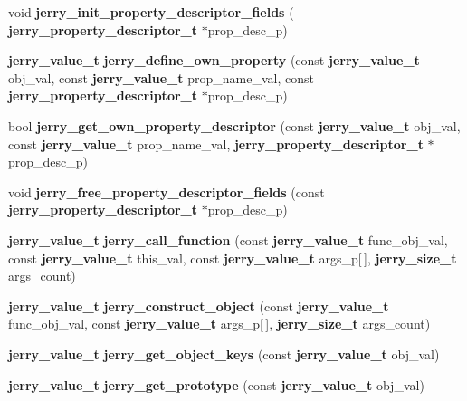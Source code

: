 \begin{DoxyCompactItemize}
void {\bfseries jerry\+\_\+init\+\_\+property\+\_\+descriptor\+\_\+fields} (\textbf{ jerry\+\_\+property\+\_\+descriptor\+\_\+t} $\ast$prop\+\_\+desc\+\_\+p)
\item 
\mbox{\label{group___core_gaf5ddf99f83fd7c4909d492ae2127e612}} 
\textbf{ jerry\+\_\+value\+\_\+t} {\bfseries jerry\+\_\+define\+\_\+own\+\_\+property} (const \textbf{ jerry\+\_\+value\+\_\+t} obj\+\_\+val, const \textbf{ jerry\+\_\+value\+\_\+t} prop\+\_\+name\+\_\+val, const \textbf{ jerry\+\_\+property\+\_\+descriptor\+\_\+t} $\ast$prop\+\_\+desc\+\_\+p)
\item 
\mbox{\label{group___core_gaced8232545e50e1c7a4db236c0495664}} 
bool {\bfseries jerry\+\_\+get\+\_\+own\+\_\+property\+\_\+descriptor} (const \textbf{ jerry\+\_\+value\+\_\+t} obj\+\_\+val, const \textbf{ jerry\+\_\+value\+\_\+t} prop\+\_\+name\+\_\+val, \textbf{ jerry\+\_\+property\+\_\+descriptor\+\_\+t} $\ast$prop\+\_\+desc\+\_\+p)
\item 
\mbox{\label{group___core_ga654d73b37a98d0ee2759dbc88948e65e}} 
void {\bfseries jerry\+\_\+free\+\_\+property\+\_\+descriptor\+\_\+fields} (const \textbf{ jerry\+\_\+property\+\_\+descriptor\+\_\+t} $\ast$prop\+\_\+desc\+\_\+p)
\item 
\mbox{\label{group___core_ga7e0345eb1c1fdd4fe729eb489dd697fc}} 
\textbf{ jerry\+\_\+value\+\_\+t} {\bfseries jerry\+\_\+call\+\_\+function} (const \textbf{ jerry\+\_\+value\+\_\+t} func\+\_\+obj\+\_\+val, const \textbf{ jerry\+\_\+value\+\_\+t} this\+\_\+val, const \textbf{ jerry\+\_\+value\+\_\+t} args\+\_\+p[$\,$], \textbf{ jerry\+\_\+size\+\_\+t} args\+\_\+count)
\item 
\mbox{\label{group___core_ga72116950ef694f16ca88e0b677bdcdac}} 
\textbf{ jerry\+\_\+value\+\_\+t} {\bfseries jerry\+\_\+construct\+\_\+object} (const \textbf{ jerry\+\_\+value\+\_\+t} func\+\_\+obj\+\_\+val, const \textbf{ jerry\+\_\+value\+\_\+t} args\+\_\+p[$\,$], \textbf{ jerry\+\_\+size\+\_\+t} args\+\_\+count)
\item 
\mbox{\label{group___core_gae9144b031e8a557b9bcddd65d402fcf6}} 
\textbf{ jerry\+\_\+value\+\_\+t} {\bfseries jerry\+\_\+get\+\_\+object\+\_\+keys} (const \textbf{ jerry\+\_\+value\+\_\+t} obj\+\_\+val)
\item 
\mbox{\label{group___core_gad5295ecdfc4e40dc7b16a0819010ae10}} 
\textbf{ jerry\+\_\+value\+\_\+t} {\bfseries jerry\+\_\+get\+\_\+prototype} (const \textbf{ jerry\+\_\+value\+\_\+t} obj\+\_\+val)
\item 
\mbox{\label{group___core_ga61464d0700ba7cd9c501888003f63e0d}} 

\end{DoxyCompactItemize}

